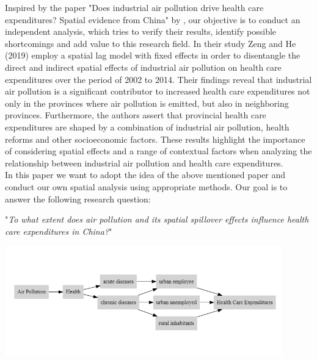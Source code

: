 \documentclass[
]{article}
\begin{document}
	Inspired by the paper "Does industrial air pollution drive health care expenditures? Spatial evidence from China" by \cite{zeng2019does}, our objective is to conduct an independent analysis, which tries to verify their results, identify possible shortcomings and add value to this research field. In their study Zeng and He (2019) employ a spatial lag model with fixed effects in order to disentangle the direct and indirect spatial effects of industrial air pollution on health care expenditures over the period of 2002 to 2014. Their findings reveal that industrial air pollution is a significant contributor to increased health care expenditures not only in the provinces where air pollution is emitted, but also in neighboring provinces. Furthermore, the authors assert that provincial health care expenditures are shaped by a combination of industrial air pollution, health reforms and other socioeconomic factors. These results highlight the importance of considering spatial effects and a range of contextual factors when analyzing the relationship between industrial air pollution and health care expenditures.\\
	In this paper we want to adopt the idea of the above mentioned paper and conduct our own spatial analysis using appropriate methods. Our goal is to answer the following research question:

	"\textit{To what extent does air pollution and its spatial spillover effects influence health care expenditures in China?}"


	\begin{center}
		\includegraphics[width=0.9\textwidth]{DAG_true.png}
		\label{fig:dag}
	\end{center}
\end{document}
